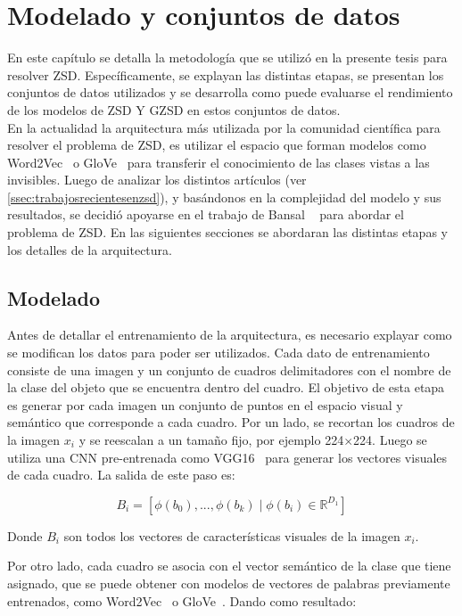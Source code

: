 \chapter{Modelado y conjuntos de datos}\label{cap:arquitecturayconjuntosdedatos}

En este capítulo se detalla la metodología que se utilizó en la presente tesis para resolver ZSD. Específicamente, se explayan las distintas etapas, se presentan los conjuntos de datos utilizados y se desarrolla como puede evaluarse el rendimiento de los modelos de ZSD Y GZSD en estos conjuntos de datos.\\

En la actualidad la arquitectura más utilizada por la comunidad científica para resolver el problema de ZSD, es utilizar el espacio que forman modelos como Word2Vec~\cite{mikolov2013distributed} o GloVe~\cite{pennington2014glove} para transferir el conocimiento de las clases vistas a las invisibles. Luego de analizar los distintos artículos (ver \autoref{ssec:trabajosrecientesenzsd}), y basándonos en la complejidad del modelo y sus resultados, se decidió apoyarse en el trabajo de Bansal \etal~\cite{bansal2018zero} para abordar el problema de ZSD. En las siguientes secciones se abordaran las distintas etapas y los detalles de la arquitectura.


\section{Modelado}\label{ssec:preprocesamiento} 
Antes de detallar el entrenamiento de la arquitectura, es necesario explayar como se modifican los datos para poder ser utilizados. Cada dato de entrenamiento consiste de una imagen y un conjunto de cuadros delimitadores con el nombre de la clase del objeto que se encuentra dentro del cuadro. El objetivo de esta etapa es generar por cada imagen un conjunto de puntos en el espacio visual y semántico que corresponde a cada cuadro. Por un lado, se recortan los cuadros de la imagen $x_i$ y se reescalan a un tamaño fijo, por ejemplo 224$\times$224. Luego se utiliza una CNN pre-entrenada como VGG16~\cite{simonyan2014very} para generar los vectores visuales de cada cuadro. La salida de este paso es:

\[B_i = [\phi(b_0),...,\phi(b_k) \mid \phi(b_i) \in \mathbb{R}^{D_1}]\] 

Donde $B_i$ son todos los vectores de características visuales de la imagen $x_i$.

Por otro lado, cada cuadro se asocia con el vector semántico de la clase que tiene asignado, que se puede obtener con modelos de vectores de palabras previamente entrenados, como Word2Vec~\cite{mikolov2013distributed} o GloVe~\cite{pennington2014glove}. Dando como resultado:

